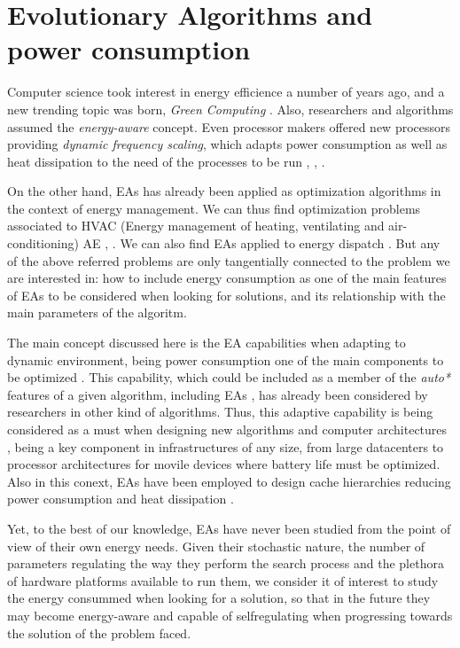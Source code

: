 \section{Evolutionary Algorithms and power consumption}
\label{eas}

Computer science took interest in energy efficience a number of years ago, and a new trending topic was born, \textit{Green Computing} \cite{green-computing}.  Also, researchers and algorithms assumed the \textit{energy-aware} \cite{energy-aware} concept.  Even processor makers offered new processors providing \textit{dynamic frequency scaling}, which adapts power consumption as well as heat dissipation to the need of the processes to be run \cite{scaling}, \cite{dynamic-scaling}, \cite{energy-efficient}.

On the other hand, EAs has already been applied as optimization algorithms in the context of energy management.  We can thus find optimization problems associated to HVAC (Energy management of heating, ventilating and air-conditioning) AE \cite{HVAC}, \cite{chiller}.  We can also find EAs applied to energy dispatch \cite{dispatch}.  But any of the above referred problems are only tangentially connected to the problem we are interested in:  how to include energy consumption as one of the main features of EAs to be considered when looking for solutions, and its relationship with the main parameters of the algoritm.

The main concept discussed here is the EA capabilities when adapting to dynamic environment, being power consumption one of the main components to be optimized \cite{ephemeral}. This capability, which could be included as a member of the \textit{auto*} features of a given algorithm, including EAs \cite{self}, has already been considered by researchers in other kind of algorithms.  Thus, this adaptive capability is being considered as a must when designing new algorithms and computer architectures \cite{energy-aware}, being a key component in infrastructures of any size, from large datacenters to processor architectures for movile devices where battery life must be optimized.  Also in this conext, EAs have been employed to design cache hierarchies reducing power consumption and heat dissipation \cite{cache}.

Yet, to the best of our knowledge, EAs have never been studied from the point of view of their own energy needs.  %
Given their stochastic nature, the number of parameters regulating the way they perform the search process and the plethora of hardware platforms available to run them, we consider it of interest to study the energy consummed when looking for a solution, so that in the future they may become energy-aware and capable of selfregulating when progressing towards the solution of the problem faced.

